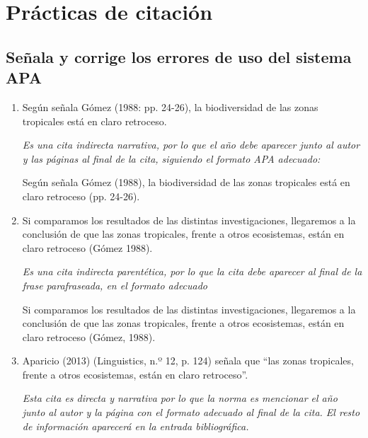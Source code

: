 \documentclass[12pt, a4paper, oneside]{report}
\begin{document}
    \chapter{Prácticas de citación}
        \section{Señala y corrige los errores de uso del sistema APA}
            \begin{Large}
                \renewcommand{\labelenumi}{\alph{enumi})}
                \begin{enumerate}
                    \item Según señala Gómez (1988: pp. 24-26), la biodiversidad de las zonas tropicales está
                    en claro retroceso.

                    \textit{Es una cita indirecta narrativa, por lo que el año debe aparecer junto al autor y
                    las páginas al final de la cita, siguiendo el formato APA adecuado:}

                    Según señala Gómez (1988), la biodiversidad de las zonas tropicales está en claro
                    retroceso (pp. 24-26).
                    \clearpage

                    \item Si comparamos los resultados de las distintas investigaciones, llegaremos a la
                    conclusión de que las zonas tropicales, frente a otros ecosistemas, están en claro
                    retroceso (Gómez 1988).

                    \textit{Es una cita indirecta parentética, por lo que la cita debe aparecer al final de la
                    frase parafraseada, en el formato adecuado}

                    Si comparamos los resultados de las distintas investigaciones, llegaremos a la conclusión
                    de que las zonas tropicales, frente a otros ecosistemas, están en claro retroceso (Gómez,
                    1988).

                    \item Aparicio (2013) (Linguistics, n.º 12, p. 124) señala que ``las zonas tropicales,
                    frente a otros ecosistemas, están en claro retroceso''.

                    \textit{Esta cita es directa y narrativa por lo que la norma es mencionar el año junto al
                    autor y la página con el formato adecuado al final de la cita. El resto de información
                    aparecerá en la entrada bibliográfica.}


\end{enumerate}
\end{Large}
\end{document}
